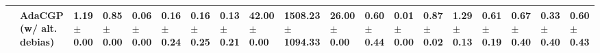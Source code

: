 \begin{tabular}{lllllllllllllllllll}
    & AdaCGP (w/ alt. debias) &  1.19 $\pm$ 0.00 &  0.85 $\pm$ 0.00 &  0.06 $\pm$ 0.00 &  0.16 $\pm$ 0.24 &  0.16 $\pm$ 0.25 &  0.13 $\pm$ 0.21 &  42.00 $\pm$ 0.00 &  1508.23 $\pm$ 1094.33 &   26.00 $\pm$ 0.00 &       0.60 $\pm$ 0.44 &       0.01 $\pm$ 0.00 &  0.87 $\pm$ 0.02 &         1.29 $\pm$ 0.13 &  0.61 $\pm$ 0.19 &  0.67 $\pm$ 0.40 &  0.33 $\pm$ 0.40 &  0.60 $\pm$ 0.43 \\
\bottomrule
\end{tabular}
